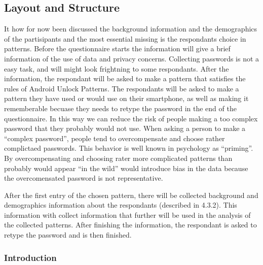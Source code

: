   
  \clearpage
  \subsection{Layout and Structure}

    It how for now been discussed the background information and the demographics of the partisipants and the most essential missing is the respondants choice in patterns. Before the questionnaire starts the information will give a brief information of the use of data and privacy concerns. Collecting passwords is not a easy task, and will might look frightning to some respondants. After the information, the respondant will be asked to make a pattern that satisfies the rules of Android Unlock Patterns. The respondants will be asked to make a pattern they have used or would use on their smartphone, as well as making it rememberable becuase they needs to retype the password in the end of the questionnaire. In this way we can reduce the risk of people making a too complex password that they probably would not use. When asking a person to make a ``complex password'', people tend to overcompensate and choose rather complictaed passwords. This behavior is well known in psychology as ``priming''. By overcompensating and choosing rater more complicated patterns than probably would appear ``in the wild'' would introduce bias in the data because the overcomensated password is not representative. 

    After the first entry of the chosen pattern, there will be collected background and demographics information about the respondants (described in 4.3.2). This information with collect information that further will be used in the analysis of the collected patterns. After finishing the information, the respondant is asked to retype the password and is then finished.     

    \subsubsection*{Introduction}
